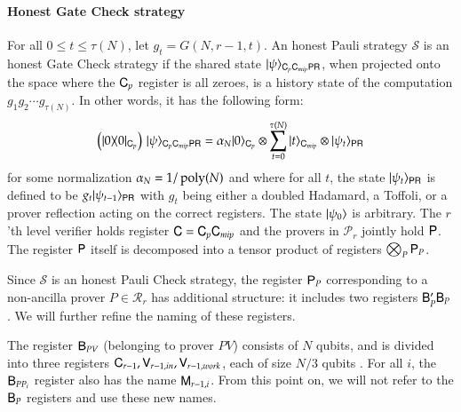 \paragraph{Honest Gate Check strategy} 

For all $0 \leq t \leq \tau(N)$, let $g_t = G(N,r-1,t)$. An honest Pauli strategy $\mathcal{S}$ is an honest Gate Check strategy if the shared state $|\psi\rangle_{{\mathsf{C}}_p {\mathsf{C}}_{mip} {\mathsf{P}} {\mathsf{R}}}$, when projected onto the space where the ${\mathsf{C}}_p$ register is all zeroes, is a history state of the computation $g_1g_2\cdots g_{\tau(N)}$. In other words, it has the following form:
\[
	\left( |0\rangle\! \langle 0|_{{\mathsf{C}}_p} \right) \, |\psi\rangle_{{\mathsf{C}}_p {\mathsf{C}}_{mip} {\mathsf{P}} {\mathsf{R}}} = \alpha_N |0\rangle_{{\mathsf{C}}_p} \otimes \sum_{t = 0}^{\tau(N)} |t\rangle_{{\mathsf{C}}_{mip}} \otimes |\psi_t\rangle_{{\mathsf{P}} {\mathsf{R}}}
\]
for some normalization $\alpha_N = 1/\operatorname{poly}(N)$ and where for all $t$, the state $|\psi_t\rangle_{{\mathsf{P}} {\mathsf{R}}}$ is defined to be $g_t |\psi_{t-1}\rangle_{{\mathsf{P}} {\mathsf{R}}}$ with $g_t$ being either a doubled Hadamard, a Toffoli, or a prover reflection acting on the correct registers. The state $|\psi_0\rangle$ is arbitrary. The $r$'th level verifier holds register ${\mathsf{C}} = {\mathsf{C}}_p {\mathsf{C}}_{mip}$ and the provers in $\mathcal{P}_r$ jointly hold ${\mathsf{P}}$. The register ${\mathsf{P}}$ itself is decomposed into a tensor product of registers $\bigotimes_P {\mathsf{P}}_P$. 

Since $\mathcal{S}$ is an honest Pauli Check strategy, the register ${\mathsf{P}}_P$ corresponding to a non-ancilla prover $P \in \mathcal{R}_r$ has additional structure: it includes two registers ${\mathsf{B}}_P' {\mathsf{B}}_P$. We will further refine the naming of these registers.

The register ${\mathsf{B}}_{PV}$ (belonging to prover $PV$) consists of $N$ qubits, and is divided into three registers ${\mathsf{C}}_{r-1}, {\mathsf{V}}_{r-1,in}, {\mathsf{V}}_{r-1,work}$, each of size $N/3$ qubits . 
For all $i$, the ${\mathsf{B}}_{PP_i}$ register also has the name ${\mathsf{M}}_{r-1,i}$. From this point on, we will not refer to the ${\mathsf{B}}_P$ registers and use these new names.

